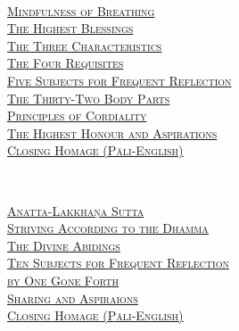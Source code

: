 {  \clearpage

  {\libertinusFont\selectfont\textbf{\textsc{\fontsize{18}{12}\selectfont{}}}}\\

  \textsc{\fontsize{14.4}{28}\selectfont
    \hyperref[mindfulness-of-breathing]{Mindfulness of Breathing} \ifdesktopversion\else\pageref{mindfulness-of-breathing}\fi\\
    \hyperref[highest-blessings]{The Highest Blessings} \ifdesktopversion\else\pageref{highest-blessings}\fi\\
    \hyperref[three-characteristics]{The Three Characteristics} \ifdesktopversion\else\pageref{three-characteristics}\fi\\
    \hyperref[four-requisites]{The Four Requisites} \ifdesktopversion\else\pageref{four-requisites}\fi\\
    \hyperref[five-reflections]{Five Subjects for Frequent Reflection} \ifdesktopversion\else\pageref{five-reflections}\fi\\
    \hyperref[32-parts]{The Thirty-Two Body Parts} \ifdesktopversion\else\pageref{32-parts}\fi\\
    \hyperref[principles-of-cordiality]{Principles of Cordiality} \ifdesktopversion\else\pageref{principles-of-cordiality}\fi\\
    \hyperref[highest-honour-aspirations]{The Highest Honour and Aspirations} \ifdesktopversion\else\pageref{highest-honour-aspirations}\fi\\
    \hyperref[closing-homage]{Closing Homage (Pāli-English)} \ifdesktopversion\else\pageref{closing-homage}\fi\\
  }

  \vspace{1.0cm}

  {\libertinusFont\selectfont\textbf{\textsc{\fontsize{18}{12}\selectfont{}}}}\\

  \textsc{\fontsize{14.4}{28}\selectfont
    \hyperref[anatta-lakkhana]{Anatta-Lakkhaṇa Sutta} \ifdesktopversion\else\pageref{anatta-lakkhana}\fi\\
    \hyperref[striving-according-to-dhamma]{Striving According to the Dhamma} \ifdesktopversion\else\pageref{striving-according-to-dhamma}\fi\\
    \hyperref[divine-abidings]{The Divine Abidings} \ifdesktopversion\else\pageref{divine-abidings}\fi\\
    \hyperref[ten-reflections]{Ten Subjects for Frequent Reflection\\ by One Gone Forth} \ifdesktopversion\else\pageref{ten-reflections}\fi\\
    \hyperref[sharing-aspirations]{Sharing and Aspiraions} \ifdesktopversion\else\pageref{sharing-aspirations}\fi\\
    \hyperref[closing-homage]{Closing Homage (Pāli-English)} \ifdesktopversion\else\pageref{closing-homage}\fi\\
  }

}
